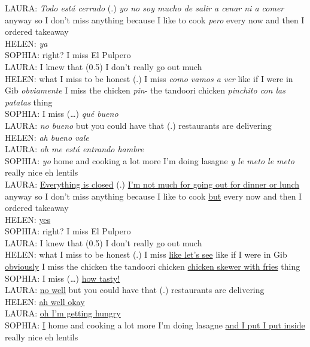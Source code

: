 \documentclass[output=paper]{langscibook}
\begin{document}
\begin{exe}\ex\label{RG:ex11}
LAURA:  \textit{Todo está cerrado} (.) \textit{yo no soy mucho de salir a cenar ni a comer} anyway so I don’t miss anything because I like to cook \textit{pero} every now and then I ordered takeaway\\
HELEN: \textit{ya}\\
SOPHIA: right? I miss El Pulpero\\
LAURA: I knew that (0.5) I don’t really go out much\\
HELEN: what I miss to be honest (.) I miss \textit{como vamos a ver} like if I were in Gib \textit{obviamente} I miss the chicken \textit{pin}- the tandoori chicken \textit{pinchito con las patatas} thing\\
SOPHIA: I miss (…) \textit{qué bueno}\\
LAURA: \textit{no bueno} but you could have that (.) restaurants are delivering\\
HELEN: \textit{ah bueno vale}\\
LAURA: \textit{oh me está entrando hambre}\\
SOPHIA: \textit{yo} home and cooking a lot more I’m doing lasagne \textit{y le meto le meto} really nice eh lentils\\

LAURA: \ul{Everything is closed} (.) \ul{I’m not much for going out for dinner or lunch} anyway so I don’t miss anything because I like to cook \ul{but} every now and then I ordered takeaway\\
HELEN: \ul{yes}\\
SOPHIA: right? I miss El Pulpero\\
LAURA: I knew that (0.5) I don’t really go out much\\
HELEN: what I miss to be honest (.) I miss \ul{like let’s see} like if I were in Gib \ul{obviously} I miss the chicken the tandoori chicken \ul{chicken skewer with fries} thing\\
SOPHIA: I miss (…) \ul{how tasty!}\\
LAURA: \ul{no well} but you could have that (.) restaurants are delivering\\
HELEN: \ul{ah well okay}\\
LAURA: \ul{oh I’m getting hungry}\\
SOPHIA: \ul{I} home and cooking a lot more I’m doing lasagne \ul{and I put I put inside} really nice eh lentils
\end{exe}
\end{document}
